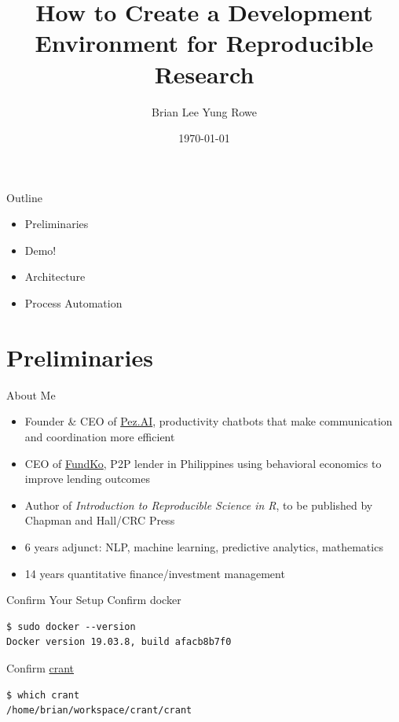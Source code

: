 \documentclass{beamer}
\title{How to Create a Development Environment for Reproducible Research}
\date{\today}
\author{Brian Lee Yung Rowe}
\institute{Founder \& CEO, Pez.AI\\ CEO, FundKo}
\begin{document}
 
\maketitle 

\begin{frame}{Outline}
\begin{itemize}
\item Preliminaries
\item Demo!
\item Architecture
\item Process Automation

\end{itemize}
\end{frame}

\section{Preliminaries}

\begin{frame}{About Me}
\begin{itemize}
\item Founder \& CEO of \href{https://pez.ai}{Pez.AI}, productivity chatbots that make communication and coordination more efficient
\item CEO of \href{https://fundko.com}{FundKo}, P2P lender in Philippines using behavioral economics to improve lending outcomes
\item Author of \emph{Introduction to Reproducible Science in R}, to be published by Chapman and Hall/CRC Press
\item 6 years adjunct: NLP, machine learning, predictive analytics, mathematics
\item 14 years quantitative finance/investment management
\end{itemize}
\end{frame}



\begin{frame}[fragile]{Confirm Your Setup}
Confirm docker
\begin{lstlisting}
$ sudo docker --version
Docker version 19.03.8, build afacb8b7f0
\end{lstlisting}

Confirm \href{https://github.com/zatonovo/crant}{crant}
\begin{lstlisting}
$ which crant
/home/brian/workspace/crant/crant
\end{lstlisting}
\end{frame}
\end{document}
